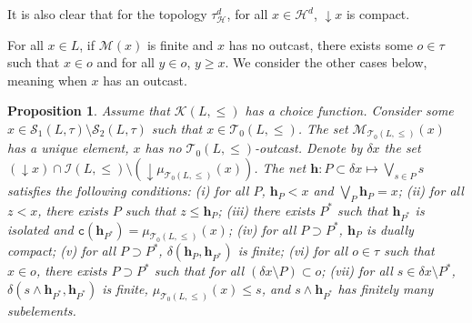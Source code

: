 \documentclass{article}
\newtheorem{proposition}[theorem]{Proposition}
\begin{document}
It is also clear that for the topology $\tau_{\mathcal{H}}^d$, for all $x \in \mathcal{H}^d$, $\mathop{\downarrow}x$ is compact. \bigskip 

For all $x \in L$, if $\mathcal{M}(x)$ is finite and $x$ has no outcast, there exists some $o \in \tau$ such that 
$x \in o$ and for all $y \in o$, $y \ge x$. We consider the other cases below, meaning when $x$ has an outcast.



\begin{proposition}\label{proposition.isolated.below.direct}
    Assume that $\mathcal{K}(L,\le)$ has a choice function. Consider some $x \in \mathcal{S}_1(L,\tau) \setminus \mathcal{S}_2(L,\tau)$ such that $x \in \mathcal{T}_0(L,\le)$. The set $\mathcal{M}_{\mathcal{T}_0(L,\le)}(x)$ has a unique element, $x$ has no $\mathcal{T}_0(L,\le)$-outcast.
    Denote by $\delta x$ the set $(\mathop{\downarrow}x) \cap \mathcal{I}(L,\le) \setminus (\mathop{\downarrow} \mu_{\mathcal{T}_0(L,\le)}(x))$. The net $\boldsymbol{h} : P \subset \delta x \mapsto \bigvee_{s \in P} s$ satisfies the following conditions: 
    (i) for all $P$, $\boldsymbol{h}_P < x$ and $\bigvee_{P} \boldsymbol{h}_P = x$; 
    (ii) for all $z < x$, there exists $P$ such that $z \le \boldsymbol{h}_P$; (iii) there exists $P^*$ such that $\boldsymbol{h}_{P^*}$ is isolated and $\texttt{c}(\boldsymbol{h}_{P^*}) = \mu_{\mathcal{T}_0(L,\le)}(x)$; (iv) for all $P \supset P^*$, $\boldsymbol{h}_P$ is dually compact; 
    (v) for all $P \supset P^*$, 
    $\delta(\boldsymbol{h}_P,\boldsymbol{h}_{P^*})$ is finite; (vi) for all $o \in \tau$ such that $x \in o$, there exists $P \supset P^*$ such that for all $(\delta x \setminus P) \subset o$; (vii) for all $s \in \delta x \setminus P^*$, $\delta(s \wedge \boldsymbol{h}_{P^*} , \boldsymbol{h}_{P^*})$ is finite, $\mu_{\mathcal{T}_0(L,\le)}(x) \le s$, and $s \wedge \boldsymbol{h}_{P^*}$ has finitely many subelements.
\end{proposition}
\end{document}
